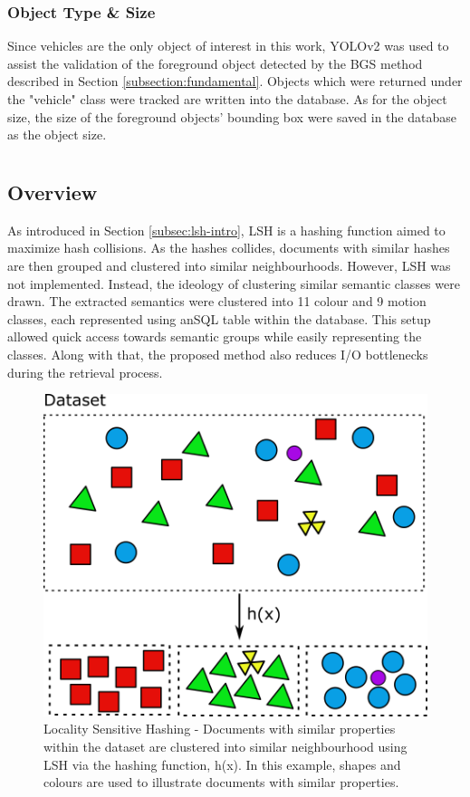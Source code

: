 \subsubsection{Object Type \& Size}
\label{objecttype}
Since vehicles are the only object of interest in this work, YOLOv2 was used to assist the validation of the foreground object detected by the BGS method described in Section \ref{subsection:fundamental}. Objects which were returned under the "vehicle" class were tracked are written into the database. As for the object size, the size of the foreground objects' bounding box were saved in the database as the object size.


\section{\versionOneExt }
\label{section:semantic_lsh}

\subsection{Overview}
As introduced in Section \ref{subsec:lsh-intro}, LSH is a hashing function aimed to maximize hash collisions.
As the hashes collides, documents with similar hashes are then grouped and clustered into similar neighbourhoods.
However, LSH was not implemented. Instead, the ideology of clustering similar semantic classes were drawn.
The extracted semantics were clustered into 11 colour and 9 motion classes, each represented using anSQL table within the database.
This setup allowed quick access towards semantic groups while easily representing the classes. Along with that, the proposed method also reduces I/O bottlenecks during the retrieval process.


\begin{figure}[hbt!]\centering
\includegraphics[width=.7\textwidth]{image/new/lsh.png}
\caption{Locality Sensitive Hashing - Documents with similar properties within the dataset are clustered into similar neighbourhood using LSH via the hashing function, h(x). In this example, shapes and colours are used to illustrate documents with similar properties.}
\label{fig:lshexample}
\end{figure}

